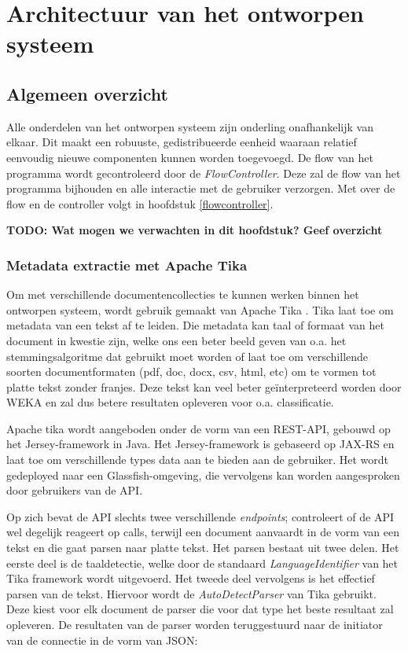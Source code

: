 \chapter{Architectuur van het ontworpen systeem}

\section{Algemeen overzicht}

Alle onderdelen van het ontworpen systeem zijn onderling onafhankelijk van elkaar. Dit maakt een robuuste, gedistribueerde eenheid waaraan relatief eenvoudig nieuwe componenten kunnen worden toegevoegd. De flow van het programma wordt gecontroleerd door de \textit{FlowController}. Deze zal de flow van het programma bijhouden en alle interactie met de gebruiker verzorgen. Met over de flow en de controller volgt in hoofdstuk \ref{flowcontroller}.

\textbf{TODO: Wat mogen we verwachten in dit hoofdstuk? Geef overzicht}
\subsection{Metadata extractie met Apache Tika}
Om met verschillende documentencollecties te kunnen werken binnen het ontworpen systeem, wordt gebruik gemaakt van Apache Tika \cite{tika}. Tika laat toe om metadata van een tekst af te leiden. Die metadata kan taal of formaat van het document in kwestie zijn, welke ons een beter beeld geven van o.a. het stemmingsalgoritme dat gebruikt moet worden of laat toe om verschillende soorten documentformaten (pdf, doc, docx, csv, html, etc) om te vormen tot platte tekst zonder franjes. Deze tekst kan veel beter ge\"interpreteerd worden door WEKA en zal dus betere resultaten opleveren voor o.a. classificatie.

Apache tika wordt aangeboden onder de vorm van een REST-API, gebouwd op het Jersey-framework in Java. Het Jersey-framework is gebaseerd op JAX-RS en laat toe om verschillende types data aan te bieden aan de gebruiker. Het wordt gedeployed naar een Glassfish-omgeving, die vervolgens kan worden aangesproken door gebruikers van de API.

Op zich bevat de API slechts twee verschillende \textit{endpoints};  controleert of de API wel degelijk reageert op calls, terwijl  een document aanvaardt in de vorm van een tekst en die gaat parsen naar platte tekst. Het parsen bestaat uit twee delen. Het eerste deel is de taaldetectie, welke door de standaard \textit{LanguageIdentifier} van het Tika framework wordt uitgevoerd. Het tweede deel vervolgens is het effectief parsen van de tekst. Hiervoor wordt de \textit{AutoDetectParser} van Tika gebruikt. Deze kiest voor elk document de parser die voor dat type het beste resultaat zal opleveren.
De resultaten van de parser worden teruggestuurd naar de initiator van de connectie in de vorm van JSON:

